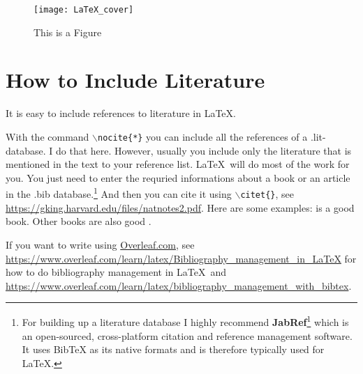 \documentclass{article}
\begin{document}
\begin{figure}
	\centering
	\texttt{[image: LaTeX\_cover]}
	\caption{This is a Figure}\label{fig:latexcover}
\end{figure}


	
	\section{How to Include Literature}\label{conclusions}
It is easy to include references to literature in \LaTeX.

With the command \texttt{$\backslash$nocite\{*\}} you can include all the references of a .lit-database. I do that here. However, usually you include only the literature that is mentioned in the text to your reference list. \LaTeX\ will do most of the work for you. You just need to enter the requried informations about a book or an article in the .bib database.\footnote{For building up a literature database I highly recommend \textbf{JabRef}\footnote{\url{www.jabref.org}} which is an open-sourced, cross-platform citation and reference management software. It uses BibTeX as its native formats and is therefore typically used for \LaTeX.} And then you can cite it using \texttt{$\backslash$citet\{\}}, see \url{https://gking.harvard.edu/files/natnotes2.pdf}.
Here are some examples:
\citet[][]{Wickham2016R} is a good book.
Other books are also good \citep[see][]{Lilja2016Linear, Matloff2011Art}.

If you want to write using \url{Overleaf.com}, see \url{https://www.overleaf.com/learn/latex/Bibliography_management_in_LaTeX} for how to do bibliography management in \LaTeX\ and \url{https://www.overleaf.com/learn/latex/bibliography_management_with_bibtex}.






\nocite{*}
	
	
	

	
\end{document}
